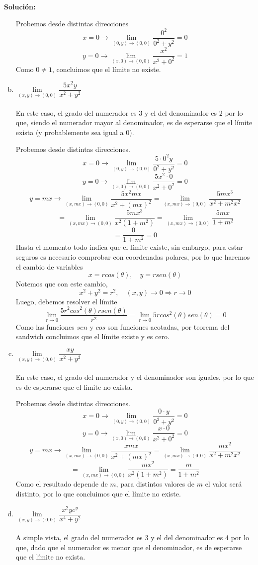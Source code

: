 \documentclass[12pt]{article}
\newenvironment{solucion}
{\begin{mdframed}[backgroundcolor=black!10]
		{\bf Solución:}\\
	}
	{
	\end{mdframed}
}
\newenvironment{preguntas}
{\begin{enumerate}\itemsep12pt
	}
	{
	\end{enumerate}
}
\newcommand{\ra}{\rightarrow}
\begin{document}
\begin{preguntas}
\begin{solucion}
\begin{enumerate}[a)]
			Probemos desde distintas direcciones
			$$x = 0 \ra \lim\limits_{(0,y) \to (0,0)} \dfrac{0^2}{0^2+y^2}
			= 0$$
			$$y = 0 \ra \lim\limits_{(x,0) \to (0,0)} \dfrac{x^2}{x^2+0^2}
			= 1$$
			Como $0 \neq 1$, concluimos que el límite no existe.
\item $\lim\limits_{(x,y) \to (0,0)} \dfrac{5x^2y}{x^2+y^2}$\\
			\\
			En este caso, el grado del numerador es 3 y el del denominador es 2 por lo que, siendo el numerador mayor al denominador, es de esperarse que el límite exista (y probablemente sea igual a 0).
			
			Probemos desde distintas direcciones.
			$$x = 0 \ra \lim\limits_{(0,y) \to (0,0)} \dfrac{5\cdot0^2y}{0^2+y^2} = 0$$
			$$y = 0 \ra \lim\limits_{(x,0) \to (0,0)} \dfrac{5x^2\cdot 0}{x^2+0^2} = 0$$
			$$y = mx \ra \lim\limits_{(x,mx) \to (0,0)} \dfrac{5x^2 mx}{x^2+(mx)^2}
			= \lim\limits_{(x,mx) \to (0,0)} \dfrac{5mx^3}{x^2+m^2x^2}$$
			$$\qquad \quad = \lim\limits_{(x,mx) \to (0,0)} \dfrac{5mx^3}{x^2(1+m^2)}
			= \lim\limits_{(x,mx) \to (0,0)} \dfrac{5mx}{1+m^2}$$
			$$= \dfrac{0}{1+m^2} = 0$$
			Hasta el momento todo indica que el límite existe, sin embargo, para estar seguros es necesario comprobar con coordenadas polares, por lo que haremos el cambio de variables
			$$x = rcos(\theta), \quad y = rsen(\theta)$$
			Notemos que con este cambio,
			$$x^2+y^2 = r^2, \quad (x,y)\ra 0 \Longrightarrow r \ra 0$$
			Luego, debemos resolver el límite
			$$\lim\limits_{r\ra 0} \dfrac{5r^2cos^2(\theta)rsen(\theta)}{r^2}
			= \lim\limits_{r\ra 0} 5rcos^2(\theta)sen(\theta) = 0$$
			Como las funciones $sen$ y $cos$ son funciones acotadas, por teorema del sandwich concluimos que el límite existe y es cero.
\item $\lim\limits_{(x,y) \to (0,0)} \dfrac{xy}{x^2+y^2}$\\
			\\
			En este caso, el grado del numerador y el denominador son iguales, por lo que es de esperarse que el límite no exista.
			
			Probemos desde distintas direcciones.
			$$x = 0 \ra \lim\limits_{(0,y) \to (0,0)} \dfrac{0\cdot y}{0^2+y^2} = 0$$
			$$y = 0 \ra \lim\limits_{(x,0) \to (0,0)} \dfrac{x\cdot 0}{x^2+0^2} = 0$$
			$$y = mx \ra \lim\limits_{(x,mx) \to (0,0)} \dfrac{x mx}{x^2+(mx)^2}
			= \lim\limits_{(x,mx) \to (0,0)} \dfrac{mx^2}{x^2+m^2x^2}$$
			$$ = \lim\limits_{(x,mx) \to (0,0)} \dfrac{mx^2}{x^2(1+m^2)}
			= \dfrac{m}{1+m^2}$$
			Como el resultado depende de $m$, para distintos valores de $m$ el valor será distinto, por lo que concluimos que el límite no existe.
\item $\lim\limits_{(x,y) \to (0,0)} \dfrac{x^2ye^y}{x^4+y^2}$\\
			\\
			A simple vista, el grado del numerador es 3 y el del denominador es 4 por lo que, dado que el numerador es menor que el denominador, es de esperarse que el límite no exista.
			

\end{enumerate}
\end{solucion}
\end{preguntas}
\end{document}
